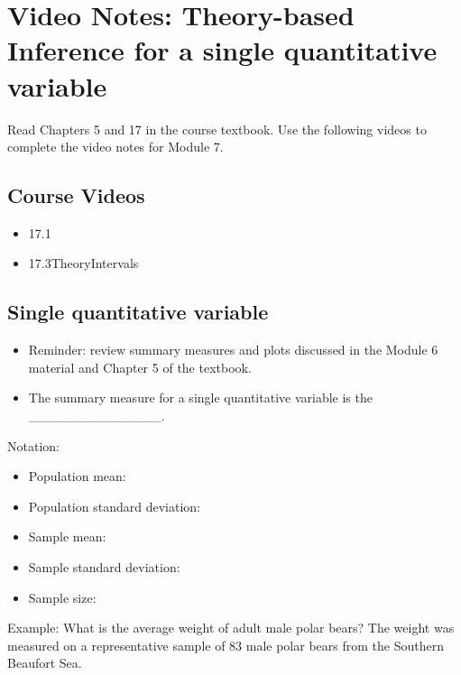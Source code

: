 \documentclass[
]{report}
\begin{document}
\newpage

\section{Video Notes: Theory-based Inference for a single quantitative variable}\label{video-notes-theory-based-inference-for-a-single-quantitative-variable}

Read Chapters 5 and 17 in the course textbook. Use the following videos to complete the video notes for Module 7.

\subsection{Course Videos}\label{course-videos-1}

\begin{itemize}
\item
  17.1
\item
  17.3TheoryIntervals
\end{itemize}


\subsection{Single quantitative variable}\label{single-quantitative-variable}

\begin{itemize}
\item
  Reminder: review summary measures and plots discussed in the Module 6 material and Chapter 5 of the textbook.
\item
  The summary measure for a single quantitative variable is the \_\_\_\_\_\_\_\_\_\_\_\_\_\_.
\end{itemize}


Notation:

\begin{itemize}
\item
  Population mean:
\item
  Population standard deviation:
\item
  Sample mean:
\item
  Sample standard deviation:
\item
  Sample size:
\end{itemize}


Example: What is the average weight of adult male polar bears? The weight was measured on a representative sample of 83 male polar bears from the Southern Beaufort Sea.
\end{document}

